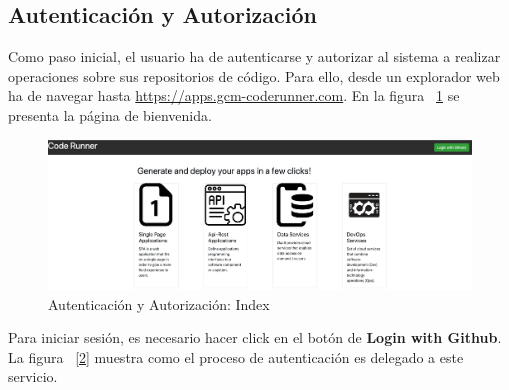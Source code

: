 \documentclass[a4paper,11pt]{book}
\begin{document}
\subsection{Autenticación y Autorización}

Como paso inicial, el usuario ha de autenticarse y autorizar al sistema a realizar operaciones sobre sus repositorios de código. Para ello, desde un explorador web ha de navegar hasta \url{https://apps.gcm-coderunner.com}. En la figura ~\ref{1} se presenta la página de bienvenida. 

\begin{figure}[H]
\centering
\includegraphics[scale=0.2]{imagenes/casouso/1_a.png}
\caption{  Autenticación y Autorización: Index }
\label{1}
\end{figure}

Para iniciar sesión, es necesario hacer click en el botón de \textbf{Login with Github}. La figura ~\ref{2} muestra como el proceso de autenticación es delegado a este servicio. 
\end{document}
